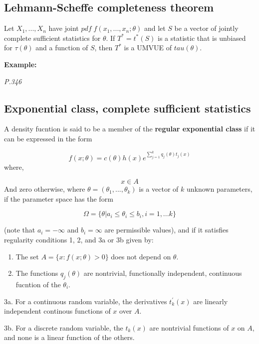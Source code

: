 \documentclass[]{book}
\begin{document}
\hypertarget{lehmann-scheffe-completeness-theorem}{%
\subsection{Lehmann-Scheffe completeness theorem}\label{lehmann-scheffe-completeness-theorem}}

Let \(X_1,...,X_n\) have joint \(pdf \; f(x_1,...,x_n; \theta)\) and let \(S\) be a vector of jointly complete sufficient statistics for \(\theta\). If \(T^*=t^*(S)\) is a statistic that is unbiased for \(\tau(\theta)\) and a function of \(S\), then \(T^*\) is a UMVUE of \(tau(\theta)\).

\textbf{Example:}

\emph{P.346}

\hypertarget{exponential-class-complete-sufficient-statistics}{%
\subsection{Exponential class, complete sufficient statistics}\label{exponential-class-complete-sufficient-statistics}}

A density fucntion is said to be a member of the \textbf{regular exponential class} if it can be expressed in the form

\[f(x; \theta)=c(\theta)h(x)e^{\sum_{j=1}^k q_j(\theta)t_j(x)}\]
where,

\[x \in A\]
And zero otherwise, where \(\theta=(\theta_1,...,\theta_k)\) is a vector of \(k\) unknown parameters, if the parameter space has the form

\[\Omega=\{\theta | a_i \leq \theta_i \leq b_i, i=1,...k\}\]

(note that \(a_i=-\infty\) and \(b_i=\infty\) are permissible values), and if it satisfies regularity conditions 1, 2, and 3a or 3b given by:

\begin{enumerate}
\def\labelenumi{(\arabic{enumi})}
\item
  The set \(A=\{x:f(x; \theta)>0\}\) does not depend on \(\theta\).
\item
  The functions \(q_j(\theta)\) are nontrivial, functionally independent, continuous fucntion of the \(\theta_i\).
\end{enumerate}

3a. For a continuous random variable, the derivatives \(t_k^{'}(x)\) are linearly independent continous functions of \(x\) over \(A\).

3b. For a discrete random variable, the \(t_k(x)\) are nontrivial functions of \(x\) on \(A\), and none is a linear function of the others.
\end{document}
